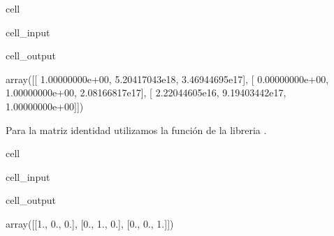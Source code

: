 \documentclass[letterpaper,10pt,english]{jupyterBook}
\begin{document}
\begin{sphinxuseclass}{cell}\begin{sphinxVerbatimInput}

\begin{sphinxuseclass}{cell_input}
\begin{sphinxVerbatim}[commandchars=\\\{\}]
\end{sphinxVerbatim}

\end{sphinxuseclass}\end{sphinxVerbatimInput}
\begin{sphinxVerbatimOutput}

\begin{sphinxuseclass}{cell_output}
\begin{sphinxVerbatim}[commandchars=\\\{\}]
array([[ 1.00000000e+00, \PYGZhy{}5.20417043e\PYGZhy{}18,  3.46944695e\PYGZhy{}17],
       [ 0.00000000e+00,  1.00000000e+00,  2.08166817e\PYGZhy{}17],
       [ 2.22044605e\PYGZhy{}16,  9.19403442e\PYGZhy{}17,  1.00000000e+00]])
\end{sphinxVerbatim}

\end{sphinxuseclass}\end{sphinxVerbatimOutput}

\end{sphinxuseclass}
\sphinxAtStartPar
Para la matriz identidad utilizamos la función  de la libreria .

\begin{sphinxuseclass}{cell}\begin{sphinxVerbatimInput}

\begin{sphinxuseclass}{cell_input}
\begin{sphinxVerbatim}[commandchars=\\\{\}]
\end{sphinxVerbatim}

\end{sphinxuseclass}\end{sphinxVerbatimInput}
\begin{sphinxVerbatimOutput}

\begin{sphinxuseclass}{cell_output}
\begin{sphinxVerbatim}[commandchars=\\\{\}]
array([[1., 0., 0.],
       [0., 1., 0.],
       [0., 0., 1.]])
\end{sphinxVerbatim}

\end{sphinxuseclass}\end{sphinxVerbatimOutput}

\end{sphinxuseclass}
\end{document}
